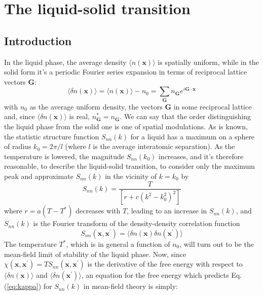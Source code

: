 \documentclass[12pt,a4paper]{article}
\begin{document}
 \section{The liquid-solid transition}

\subsection{Introduction}

 In the liquid phase, the average density $\langle n(\textbf{x}) \rangle$ is spatially uniform, while in the solid form it's a periodic Fourier series expansion in terms of reciprocal lattice vectors $\textbf{G}$:
\begin{equation} \label{inizio}
\langle \delta n(\textbf{x}) \rangle = \langle n(\textbf{x}) \rangle - n_0 =\sum_\textbf{G} n_\textbf{G} e^{i\textbf{G} \cdot \textbf{x}}
\end{equation}
with $n_0$ as the average uniform density, the vectors $\textbf{G}$ in some reciprocal lattice and, since $\langle \delta n(\textbf{x}) \rangle$ is real, $ n^*_\textbf{G} = n_\textbf{G}$. We can say that the order distinguishing the liquid phase from the solid one is one of spatial modulations. As is known, the statistic structure function $S_{nn}(k)$ for a liquid has a maximum on a sphere of radius $k_0 = 2 \pi / l$ (where $l$ is the average interatomic separation). As the temperature is lowered, the magnitude $S_{nn}(k_0)$ increases, and it's therefore reasonable, to describe the liquid-solid transition, to consider only the maximum peak and approximate $S_{nn}(k)$ in the vicinity of $k=k_0$ by
\begin{equation}
\label{eq:kappa}
S_{nn}(k)=\frac{T}{[r+c(k^2-k^2_0)^2]}
\end{equation}
 where $r=a(T-T^*)$ decreases with $T$, leading to an increase in $S_{nn}(k)$, and $S_{nn}(k)$ is the Fourier transform of the density-density correlation function
\begin{equation}
S_{nn}( \textbf{x}, \textbf{x} ^\prime)= \langle \delta n(\textbf{x})\delta n(\textbf{x}^\prime) \rangle
\end{equation}
The temperature $T^*$, which is in general a function of $n_0$, will turn out to be the mean-field limit of stability of the liquid phase.
Now, since $\chi( \textbf{x} ,\textbf{x} ^\prime) = T S_{nn} ( \textbf{x} ,\textbf{x} ^\prime)$ is the derivative of the free energy  with respect to $ \langle \delta n(\textbf{x})\rangle$ and  $\langle \delta n(\textbf{x}^\prime)\rangle$, an equation for the free energy which predicts Eq.(\ref{eq:kappa}) for $S_{nn}(k)$ in mean-field theory is simply:
\end{document}
